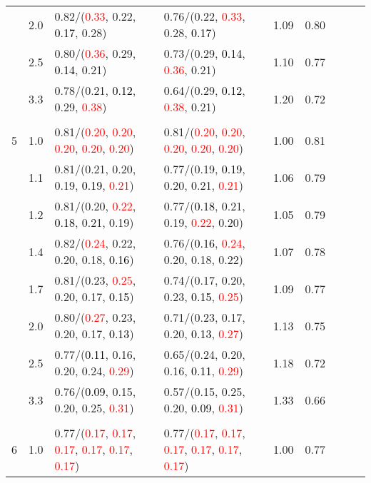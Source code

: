 \documentclass[10pt,a4paper]{report}
\begin{document}
\begin{table}[!htbp]
\begin{center}
{\begin{tabular}{ccllccccc}
			&2.0&0.82/(\textcolor{red}{0.33}, 0.22, \textcolor{black}{0.17}, 0.28)&0.76/(0.22, \textcolor{red}{0.33}, 0.28, \textcolor{black}{0.17})&1.09&0.80\\
			&2.5&0.80/(\textcolor{red}{0.36}, 0.29, \textcolor{black}{0.14}, 0.21)&0.73/(0.29, \textcolor{black}{0.14}, \textcolor{red}{0.36}, 0.21)&1.10&0.77\\
			&3.3&0.78/(0.21, \textcolor{black}{0.12}, 0.29, \textcolor{red}{0.38})&0.64/(0.29, \textcolor{black}{0.12}, \textcolor{red}{0.38}, 0.21)&1.20&0.72\\
			&&&&\\
			5			&1.0&0.81/(\textcolor{red}{0.20}, \textcolor{red}{0.20}, \textcolor{red}{0.20}, \textcolor{red}{0.20}, \textcolor{red}{0.20})&0.81/(\textcolor{red}{0.20}, \textcolor{red}{0.20}, \textcolor{red}{0.20}, \textcolor{red}{0.20}, \textcolor{red}{0.20})&1.00&0.81\\
			&1.1&0.81/(0.21, 0.20, 0.19, \textcolor{black}{0.19}, \textcolor{red}{0.21})&0.77/(0.19, \textcolor{black}{0.19}, 0.20, 0.21, \textcolor{red}{0.21})&1.06&0.79\\
			&1.2&0.81/(0.20, \textcolor{red}{0.22}, \textcolor{black}{0.18}, 0.21, 0.19)&0.77/(\textcolor{black}{0.18}, 0.21, 0.19, \textcolor{red}{0.22}, 0.20)&1.05&0.79\\
			&1.4&0.82/(\textcolor{red}{0.24}, 0.22, 0.20, 0.18, \textcolor{black}{0.16})&0.76/(\textcolor{black}{0.16}, \textcolor{red}{0.24}, 0.20, 0.18, 0.22)&1.07&0.78\\
			&1.7&0.81/(0.23, \textcolor{red}{0.25}, 0.20, 0.17, \textcolor{black}{0.15})&0.74/(0.17, 0.20, 0.23, \textcolor{black}{0.15}, \textcolor{red}{0.25})&1.09&0.77\\
			&2.0&0.80/(\textcolor{red}{0.27}, 0.23, 0.20, 0.17, \textcolor{black}{0.13})&0.71/(0.23, 0.17, 0.20, \textcolor{black}{0.13}, \textcolor{red}{0.27})&1.13&0.75\\
			&2.5&0.77/(\textcolor{black}{0.11}, 0.16, 0.20, 0.24, \textcolor{red}{0.29})&0.65/(0.24, 0.20, 0.16, \textcolor{black}{0.11}, \textcolor{red}{0.29})&1.18&0.72\\
			&3.3&0.76/(\textcolor{black}{0.09}, 0.15, 0.20, 0.25, \textcolor{red}{0.31})&0.57/(0.15, 0.25, 0.20, \textcolor{black}{0.09}, \textcolor{red}{0.31})&1.33&0.66\\
			&&&&\\
			6			&1.0&0.77/(\textcolor{red}{0.17}, \textcolor{red}{0.17}, \textcolor{red}{0.17}, \textcolor{red}{0.17}, \textcolor{red}{0.17}, \textcolor{red}{0.17})&0.77/(\textcolor{red}{0.17}, \textcolor{red}{0.17}, \textcolor{red}{0.17}, \textcolor{red}{0.17}, \textcolor{red}{0.17}, \textcolor{red}{0.17})&1.00&0.77\\

\end{tabular}}
\end{center}
\end{table}
\end{document}
